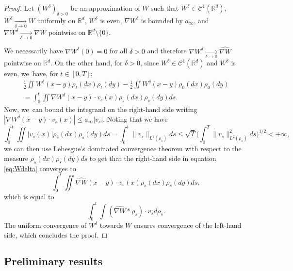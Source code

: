 \documentclass[11pt]{article}
\numberwithin{equation}{section}
\def\RR{\mathbb{R}}
\newcommand{\limi}[2]{\underset{#1 \to #2}{\longrightarrow}}
\def\calC{{\mathcal C}}
\def\nabWchapo{\widehat{\nabla W}}
\theoremstyle{plain}
\theoremstyle{definition}
\begin{document}
\begin{proof}
Let $(W^\delta)_{\delta > 0}$ be an approximation of $W$ such that $W^\delta \in \calC^1(\RR^d)$, $W^\delta \limi{\delta}{0} W$ uniformly on $\RR^d$, $W^\delta$ is even, $\nabla W^\delta$ is bounded by $a_\infty$, and $\nabla W^\delta \limi{\delta}{0} \nabla W$ pointwise on $\RR^d \setminus \{0\}$.

We necessarily have $\nabla W^\delta(0) = 0$ for all $\delta>0$ and therefore $\nabla W^\delta \limi{\delta}{0} \nabWchapo$ pointwise on $\RR^d$. On the other hand, for $\delta > 0$, since $W^\delta \in \calC^1(\RR^d)$ and $W^\delta$ is even, we~have, for $t \in [0,T]$:
\begin{multline}\label{eq:Wdelta}
\frac 12 \iint W^\delta(x-y) \rho_t(dx) \rho_t(dy) - \frac 12 \iint W^\delta(x-y) \rho_0(dx) \rho_0(dy) \\
= \int_0^t \iint \nabla W^\delta(x-y) \cdot v_s(x) \rho_s(dx) \rho_s(dy) ds.
\end{multline}
Now, we~can bound the integrand on the right-hand side writing $|\nabla W^\delta(x-y) \cdot v_s(x)| \leq a_\infty |v_s|$. Noting that we have
\[
\int_0^t \iint |v_s(x)| \rho_s(dx)\rho_s(dy)ds = \int_0^t \|v_s\|_{L^1(\rho_s)} ds \leq \sqrt{T} \Big(\int_0^T \|v_s\|_{L^2(\rho_s)}^2 ds\Big)^{1/2} < +\infty,
\]
we can then use Lebesgue's dominated convergence theorem with respect to the measure $\rho_s(dx)\rho_s(dy)ds$ to get that the right-hand side in equation \eqref{eq:Wdelta} converges to
\[
\int_0^t \iint \nabWchapo(x-y) \cdot v_s(x) \rho_s(dx) \rho_s(dy) ds,
\]
which is equal to
\[
\int_0^t \int (\nabWchapo * \rho_s) \cdot v_s d\rho_s.
\]
The uniform convergence of $W^\delta$ towards $W$ ensures convergence of the left-hand side, which concludes the proof.
\end{proof}

\subsection{Preliminary results}
\end{document}
